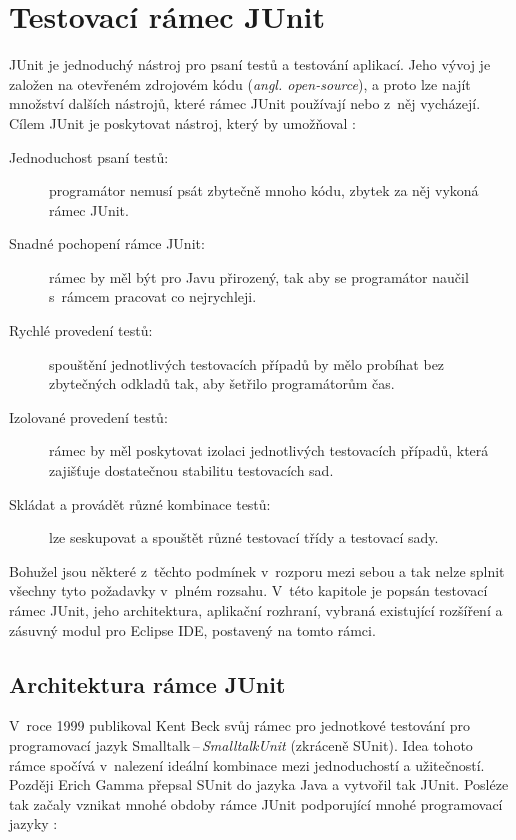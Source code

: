 \chapter{Testovací rámec JUnit}                                           %
JUnit je jednoduchý nástroj pro psaní testů a testování aplikací. Jeho vývoj je založen na otevřeném zdrojovém kódu (\emph{angl. open-source}), a proto lze najít množství dalších nástrojů, které rámec JUnit používají nebo z~něj vycházejí. Cílem JUnit je poskytovat nástroj, který by umožňoval \cite{JUnitGuide}:
\begin{description}
  \item[Jednoduchost psaní testů:]
  programátor nemusí psát zbytečně mnoho kódu, zbytek za něj vykoná rámec JUnit.
  \item[Snadné pochopení rámce JUnit:]
  rámec by měl být pro Javu přirozený, tak aby se programátor naučil s~rámcem pracovat co nejrychleji.
  \item[Rychlé provedení testů:]
  spouštění jednotlivých testovacích případů by mělo probíhat bez zbytečných odkladů tak, aby šetřilo programátorům čas.
  \item[Izolované provedení testů:]
  rámec by měl poskytovat izolaci jednotlivých testovacích případů, která zajišťuje dostatečnou stabilitu testovacích sad.
  \item[Skládat a provádět různé kombinace testů:]
  lze seskupovat a spouštět různé testovací třídy a testovací sady.
\end{description}

Bohužel jsou některé z~těchto podmínek v~rozporu mezi sebou a tak nelze splnit všechny tyto požadavky v~plném rozsahu. V~této kapitole je popsán testovací rámec JUnit, jeho architektura, aplikační rozhraní, vybraná existující rozšíření a zásuvný modul pro Eclipse IDE, postavený na tomto rámci.


  \section{Architektura rámce JUnit}
  V~roce 1999 publikoval Kent Beck svůj rámec pro jednotkové testování pro programovací jazyk Smalltalk\,--\,\emph{SmalltalkUnit} (zkráceně SUnit). Idea tohoto rámce spočívá v~nalezení ideální kombinace mezi jednoduchostí a užitečností. Později Erich Gamma přepsal SUnit do jazyka Java a vytvořil tak JUnit. Posléze tak začaly vznikat mnohé obdoby rámce JUnit podporující mnohé programovací jazyky \cite{UnitTestFrameworks}:

